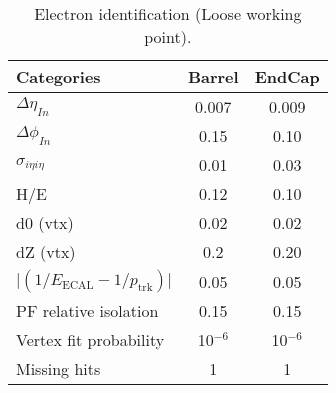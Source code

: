 \begin{table}[h!]
  \caption{Electron identification (Loose working point).\label{tab:ele-id}}
  \centering
  \footnotesize
  \begin{tabular}{ lcc }
    \hline
    \hline
    Categories                                               & Barrel    & EndCap    \\
    \hline
    $\Delta \eta_{In}$                                       & 0.007     & 0.009     \\
    $\Delta \phi_{In}$                                       & 0.15      & 0.10      \\
    $\sigma_{i\eta i\eta}$                                   & 0.01      & 0.03      \\
    H/E                                                      & 0.12      & 0.10      \\
    d0 (vtx)                                                 & 0.02      & 0.02      \\
    dZ (vtx)                                                 & 0.2       & 0.20      \\
    $\lvert(1/E_{\textrm{ECAL}} - 1/p_{\textrm{trk}})\rvert$ & 0.05      & 0.05      \\
    PF relative isolation                                    & 0.15      & 0.15      \\
    Vertex fit probability                                   & 10$^{-6}$ & 10$^{-6}$ \\
    Missing hits                                             & 1         & 1         \\
    \hline
    \hline
  \end{tabular}
\end{table}

